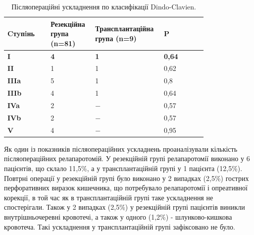 \begin{table}[]
\centering
\caption{Післяопераційні ускладнення по класифікації Dindo-Clavien.}
\label{tab:dindopac}

\begin{tabular}{|p{0.2\linewidth}|
                 p{0.2\linewidth}|
                 p{0.2\linewidth}|
                 p{0.2\linewidth}|}
\hline
{\color[HTML]{231F20} \textbf{Cтyпiнь}} &
  {\color[HTML]{231F20} \textbf{Резекційна група (n=81)}} &
  {\color[HTML]{231F20} \textbf{Транс\-план\-тацій\-на група (n=9)}} &
  {\color[HTML]{231F20} \textbf{P}} \\ \hline
{\color[HTML]{231F20} \textbf{I}} &
  {\color[HTML]{231F20} \textbf{4}} &
  {\color[HTML]{231F20} \textbf{1}} &
  {\color[HTML]{231F20} \textbf{0,64}} \\ \hline
{\color[HTML]{231F20} \textbf{II}}   & {\color[HTML]{231F20} 1} & {\color[HTML]{231F20} 1} & {\color[HTML]{231F20} 0,62} \\ \hline
{\color[HTML]{231F20} \textbf{IIIa}} & {\color[HTML]{231F20} 5} & {\color[HTML]{231F20} 1} & {\color[HTML]{231F20} 0,8}  \\ \hline
{\color[HTML]{231F20} \textbf{IIIb}} & {\color[HTML]{231F20} 4} & {\color[HTML]{231F20} 1} & {\color[HTML]{231F20} 0,64} \\ \hline
{\color[HTML]{231F20} \textbf{IVa}}  & {\color[HTML]{231F20} 2} & {\color[HTML]{231F20} −} & {\color[HTML]{231F20} 0,57} \\ \hline
{\color[HTML]{231F20} \textbf{IVb}}  & {\color[HTML]{231F20} 2} & {\color[HTML]{231F20} −} & {\color[HTML]{231F20} 0,57} \\ \hline
{\color[HTML]{231F20} \textbf{V}}    & {\color[HTML]{231F20} 4} & {\color[HTML]{231F20} −} & {\color[HTML]{231F20} 0,95} \\ \hline
\end{tabular}
\end{table}



Як один із показників післяопераційних ускладнень проаналізували кількість післяопераційних релапаротомій. У резекційній групі релапаротомії виконано у 6 пацієнтів, що склало 11,5\%, а у трансплантаційній групі у 1 пацієнта (12,5\%). 
Повтрні операції у резекційній групі було виконано у 2 випадках (2,5\%) гострих перфоративних виразок кишечника, що потребувало релапаротомії і опреативної корекції, в той час як в трансплантаційній групі таке ускладнення не спостерігали. Також у 2 випадках (2,5\%) у резекційній групі пацієнтів виникли внутрішньочеревні кровотечі, а також у одного (1,2\%) - шлунково-кишкова кровотеча. Такі ускладнення у трансплантаційній групі зафіксовано не було. 

